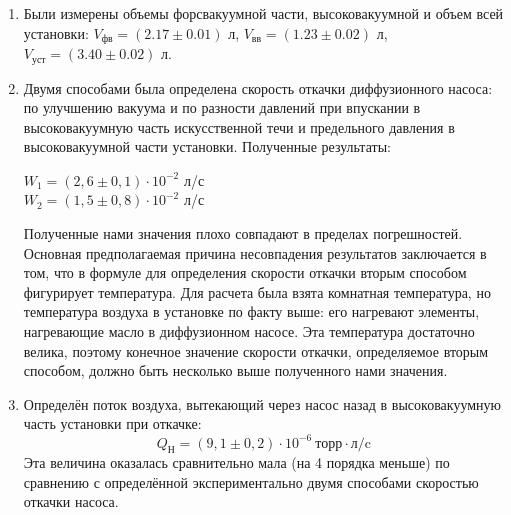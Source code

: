 \documentclass[12pt,a4paper]{article}
\begin{document}
\begin{enumerate}

\item Были измерены объемы форсвакуумной части, высоковакуумной и объем всей установки: $V_{фв} = (2.17 \pm 0.01)$ л,  $V_{вв} = (1.23 \pm 0.02)$ л, $V_{уст} = (3.40 \pm 0.02)$ л. 

\item Двумя способами была определена скорость откачки диффузионного насоса: по улучшению вакуума и по разности давлений при впускании в высоковакуумную часть искусственной течи и предельного давления в высоковакуумной части установки. Полученные результаты:
\begin{center}
$W_1 = (2,6 \pm 0,1) \cdot 10^{-2}$ л/с\\
$W_2 = (1,5 \pm 0,8) \cdot 10^{-2}$ л/с
\end{center}

Полученные нами значения плохо совпадают в пределах погрешностей.  Основная предполагаемая причина несовпадения результатов заключается в том, что в формуле для определения скорости откачки вторым способом фигурирует температура. Для расчета была взята комнатная температура, но температура воздуха в установке по факту выше: его нагревают элементы, нагревающие масло в диффузионном насосе. Эта температура достаточно велика, поэтому конечное значение скорости откачки, определяемое вторым способом, должно быть несколько выше полученного нами значения.

\item Определён поток воздуха, вытекающий через насос назад в высоковакуумную часть установки при откачке:
	$$Q_\text{Н} = (9,1 \pm 0,2)\cdot 10^{-6} ~\text{торр}\cdot\text{л/c}$$
 Эта величина оказалась сравнительно мала (на 4 порядка меньше) по сравнению с определённой экспериментально двумя способами скоростью откачки насоса.



\end{enumerate}
\end{document}

